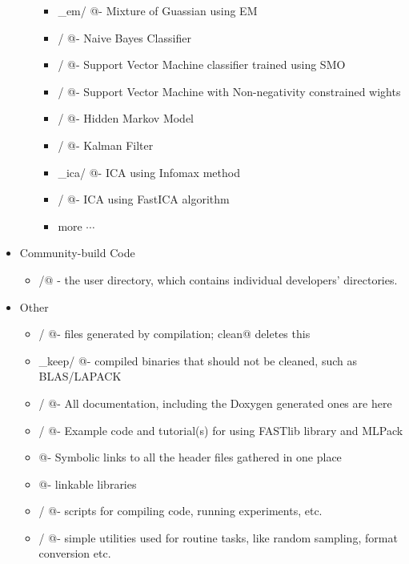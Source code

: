 \documentclass[letter]{report}
\begin{document}
\begin{itemize}
\begin{itemize}
\begin{itemize}
      \item \verb@mog_em/      @- Mixture of Guassian using EM
      \item \verb@nbc/         @- Naive Bayes Classifier
      \item \verb@svm/         @- Support Vector Machine classifier trained using SMO
      \item \verb@nnsvm/       @- Support Vector Machine with Non-negativity constrained wights
      \item \verb@hmm/         @- Hidden Markov Model
      \item \verb@kalman/      @- Kalman Filter
      \item \verb@infomax_ica/ @- ICA using Infomax method
      \item \verb@fastica/     @- ICA using FastICA algorithm 
      \item more $\cdots$
    \end{itemize}
  \end{itemize}
\item Community-build Code
  \begin {itemize}
  \item \verb@contrib/@ - the user directory, which contains individual developers' directories. 
\end {itemize} 
\item  Other
  \begin {itemize}
  \item \verb@bin/      @- files generated by compilation; \verb@make clean@ deletes this
  \item \verb@bin_keep/ @- compiled binaries that should not be cleaned, such as BLAS/LAPACK
  \item \verb@doc/      @- All documentation, including the Doxygen generated ones are here
  \item \verb@examples/ @- Example code and tutorial(s) for using FASTlib library and MLPack
  \item \verb@include   @- Symbolic links to all the header files gathered in one place
  \item \verb@lib       @- linkable libraries
  \item \verb@script/   @- scripts for compiling code, running experiments, etc.
  \item \verb@util/     @- simple utilities used for routine tasks, like random sampling, format conversion etc.
  \end {itemize}
\end{itemize}
\end{document}
